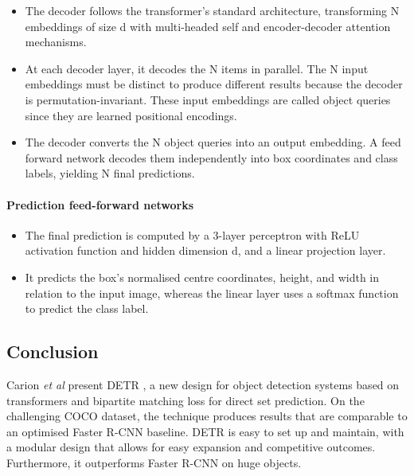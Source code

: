 \begin{itemize}
	\item The decoder follows the transformer's standard architecture, transforming N embeddings of size d with multi-headed self and encoder-decoder attention mechanisms.
	\item At each decoder layer, it decodes the N items in parallel. The N input embeddings must be distinct to produce different results because the decoder is permutation-invariant. These input embeddings are called object queries since they are learned positional encodings.
	\item The decoder converts the N object queries into an output embedding. A feed forward network decodes them independently into box coordinates and class labels, yielding N final predictions. 
\end{itemize}	

\paragraph{Prediction feed-forward networks}

\begin{itemize}
	\item The final prediction is computed by a 3-layer perceptron with ReLU activation function and hidden dimension d, and a linear projection layer. 
	\item It predicts the box's normalised centre coordinates, height, and width in relation to the input image, whereas the linear layer uses a softmax function to predict the class label. 
\end{itemize}	

\subsection{Conclusion}
\par Carion \textit{et al} present DETR \cite{carion2020detr}, a new design for object detection systems based on transformers and bipartite matching loss for direct set prediction. On the challenging COCO dataset, the technique produces results that are comparable to an optimised Faster R-CNN baseline. DETR is easy to set up and maintain, with a modular design that allows for easy expansion and competitive outcomes. Furthermore, it outperforms Faster R-CNN on huge objects.